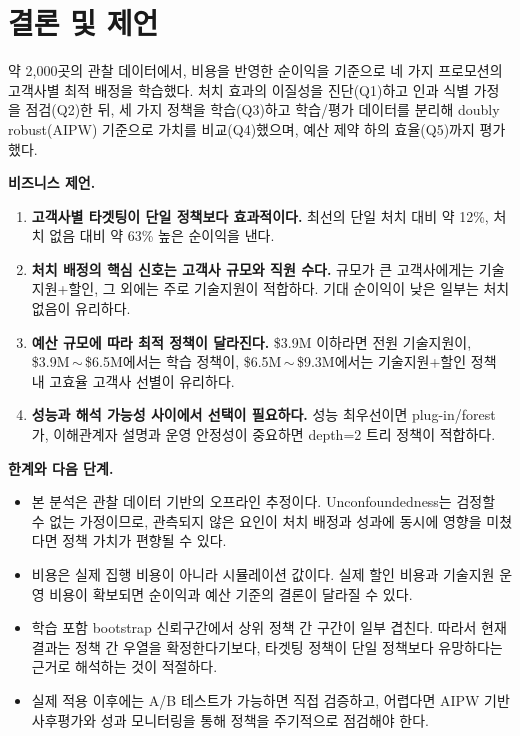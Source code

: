\documentclass[11pt]{article}
\begin{document}
\section{결론 및 제언}

약 2{,}000곳의 관찰 데이터에서, 비용을 반영한 순이익을 기준으로 네 가지 프로모션의 고객사별 최적 배정을 학습했다. 처치 효과의 이질성을 진단(Q1)하고 인과 식별 가정을 점검(Q2)한 뒤, 세 가지 정책을 학습(Q3)하고 학습/평가 데이터를 분리해 doubly robust(AIPW) 기준으로 가치를 비교(Q4)했으며, 예산 제약 하의 효율(Q5)까지 평가했다.

\textbf{비즈니스 제언.}
\begin{enumerate}[leftmargin=1.6em, itemsep=2pt]
  \item \textbf{고객사별 타겟팅이 단일 정책보다 효과적이다.} 최선의 단일 처치 대비 약 12\%, 처치 없음 대비 약 63\% 높은 순이익을 낸다.
  \item \textbf{처치 배정의 핵심 신호는 고객사 규모와 직원 수다.} 규모가 큰 고객사에게는 기술지원+할인, 그 외에는 주로 기술지원이 적합하다. 기대 순이익이 낮은 일부는 처치 없음이 유리하다.
  \item \textbf{예산 규모에 따라 최적 정책이 달라진다.} \$3.9M 이하라면 전원 기술지원이, \$3.9M\,$\sim$\,\$6.5M에서는 학습 정책이, \$6.5M\,$\sim$\,\$9.3M에서는 기술지원+할인 정책 내 고효율 고객사 선별이 유리하다.
  \item \textbf{성능과 해석 가능성 사이에서 선택이 필요하다.} 성능 최우선이면 plug-in/forest가, 이해관계자 설명과 운영 안정성이 중요하면 depth=2 트리 정책이 적합하다.
\end{enumerate}

\textbf{한계와 다음 단계.}
\begin{itemize}[leftmargin=1.4em, itemsep=2pt]
  \item 본 분석은 관찰 데이터 기반의 오프라인 추정이다. Unconfoundedness는 검정할 수 없는 가정이므로, 관측되지 않은 요인이 처치 배정과 성과에 동시에 영향을 미쳤다면 정책 가치가 편향될 수 있다.
  \item 비용은 실제 집행 비용이 아니라 시뮬레이션 값이다. 실제 할인 비용과 기술지원 운영 비용이 확보되면 순이익과 예산 기준의 결론이 달라질 수 있다.
  \item 학습 포함 bootstrap 신뢰구간에서 상위 정책 간 구간이 일부 겹친다. 따라서 현재 결과는 정책 간 우열을 확정한다기보다, 타겟팅 정책이 단일 정책보다 유망하다는 근거로 해석하는 것이 적절하다.
  \item 실제 적용 이후에는 A/B 테스트가 가능하면 직접 검증하고, 어렵다면 AIPW 기반 사후평가와 성과 모니터링을 통해 정책을 주기적으로 점검해야 한다.
\end{itemize}
\end{document}
